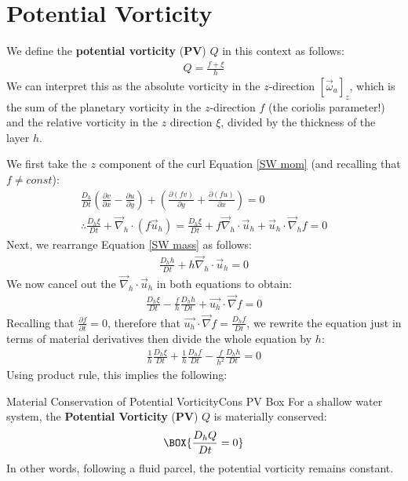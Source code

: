 \section{Potential Vorticity}\label{PV}

We define the \textbf{potential vorticity} (\textbf{PV}) $Q$ in this context as follows:
\begin{align*}
    \boxed{Q = \frac{f+\xi}{h}}
\end{align*}
We can interpret this as the absolute vorticity in the $z$-direction $[\vec{\omega}_a]_z$, which is the sum of the planetary vorticity in the $z$-direction $f$ (the coriolis parameter!) and the relative vorticity in the $z$ direction $\xi$, divided by the thickness of the layer $h$.

We first take the $z$ component of the curl Equation \ref{SW mom} (and recalling that $f\neq const$):
\begin{align*}
    \frac{D_h}{Dt}\left( \frac{\partial v}{\partial x}- \frac{\partial u}{\partial y}\right) + \left( \frac{\partial (fv)}{\partial y} + \frac{\partial (fu)}{\partial x}\right) = 0
    \\
    \therefore \frac{D_h \xi}{Dt} + \vec{\nabla}_h \cdot \left( f\vec{u}_h \right)= \frac{D_h \xi}{Dt} + f\vec{\nabla}_h \cdot\vec{u}_h + \vec{u}_h \cdot \vec{\nabla}_h f = 0
\end{align*}
Next, we rearrange Equation \ref{SW mass} as follows:
\begin{align*}
    \frac{D_h h}{Dt}+h\vec{\nabla}_h \cdot \vec{u}_h=0
\end{align*}
We now cancel out the $\vec{\nabla}_h\cdot \vec{u}_h$ in both equations to obtain:
\begin{align*}
    \frac{D_h \xi}{Dt} - \frac{f}{h}\frac{D_h h}{Dt} + \vec{u_h}\cdot\vec{\nabla}f = 0
\end{align*}
Recalling that $\frac{\partial f}{\partial t}=0$, therefore that $\vec{u_h}\cdot\vec{\nabla}f=\frac{D_h f}{Dt}$, we rewrite the equation just in terms of material derivatives then divide the whole equation by $h$:
\begin{align*}
    \frac{1}{h}\frac{D_h \xi}{Dt} +\frac{1}{h}\frac{D_h f}{Dt} - \frac{f}{h^2}\frac{D_h h}{Dt}=0
\end{align*}
Using product rule, this implies the following:

\begin{fact}{Material Conservation of Potential Vorticity}{Cons PV Box}\label{Cons PV Box}
    For a shallow water system, the \textbf{Potential Vorticity} (\textbf{PV}) $Q$ is materially conserved: 
    \begin{align}
        \BOX{
            \frac{D_h Q}{Dt}=0
        }
    \end{align}
    In other words, following a fluid parcel, the potential vorticity remains constant.
\end{fact}

